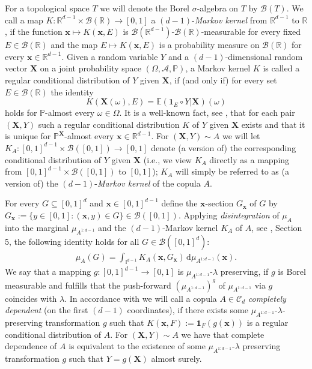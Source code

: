 \documentclass[12pt,a4paper]{amsart}
\theoremstyle{definition}
\newcommand{\kc}{\mathcal{C}}
\begin{document}
For a topological space $T$ we will denote the Borel $\sigma$-algebra on $T$ by $\mathcal{B}(T)$.
We call a map 
$K: \mathbb{R}^{d-1}\times\mathcal{B}(\mathbb{R}) \rightarrow [0,1]$ a
$(d-1)$-\emph{Markov kernel} from 
$\mathbb{R}^{d-1}$ to $\mathbb{R}$, if the function 
$\mathbf{x}\mapsto K(\mathbf{x},E)$ is 
$\mathcal{B}(\mathbb{R}^{d-1})$-$\mathcal{B}(\mathbb{R})$-measurable for every fixed 
$E\in\mathcal{B}(\mathbb{R})$ and the map $E\mapsto K(\mathbf{x},E)$ is a probability measure 
on $\mathcal{B}(\mathbb{R})$ for every $\mathbf{x}\in\mathbb{R}^{d-1}$. 
Given a random variable $Y$ and a $(d-1)$-dimensional random vector 
$\mathbf{X}$ on a joint probability space $(\Omega,\mathcal{A},\mathbb{P})$, a Markov kernel 
$K$ is called a regular conditional distribution of
$Y$ given $\mathbf{X}$, if (and only if) for every set 
$E \in \mathcal{B}(\mathbb{R})$ the identity 
$$
K(\mathbf{X}(\omega), E) = \mathbb{E}(\mathbf{1}_E \circ Y | \mathbf{X})(\omega)
$$
holds for $\mathbb{P}$-almost every $\omega \in \Omega$.
It is a well-known fact, see \cite{Kallenberg}, that for each pair $(\mathbf{X}, Y)$ 
such a regular conditional distribution $K$ of $Y$ given $\mathbf{X}$ exists and that it is 
unique for $\mathbb{P}^{\mathbf{X}}$-almost every $\mathbf{x} \in \mathbb{R}^{d-1}$.
For $(\mathbf{X}, Y) \sim A$ we will let 
$K_{A}:[0,1]^{d-1} \times \mathcal{B}([0,1]) \to [0,1]$ denote (a version of) the corresponding 
conditional distribution of $Y$ given $\mathbf{X}$ (i.e., we view 
$K_A$ directly as a mapping from $[0,1]^{d-1} \times \mathcal{B}([0,1])$ to 
$[0,1]$); $K_A$ will simply be referred to as 
(a version of) the $(d-1)$-\emph{Markov kernel} of the copula $A$. 

For every $G \subseteq [0,1]^d$ and $\mathbf{x} \in [0,1]^{d-1}$ 
define the $\mathbf{x}$-section $G_\mathbf{x}$ of $G$ by $G_{\mathbf{x}}:=\{y\in [0,1]: 
(\mathbf{x},y) \in G\}\in\mathcal{B}([0,1])$. 
Applying \emph{disintegration} of $\mu_A$ into the marginal $\mu_{A^{1:d-1}}$ and the 
$(d-1)$-Markov kernel $K_A$ of $A$,
 see \cite{Kallenberg}, Section 5, the following identity 
holds for all $G \in \mathcal{B}([0,1]^d)$:
\begin{align}\label{eq:DI}
	\mu_A(G) = \int_{\mathbb{I}^{d-1}} K_{A}(\mathbf{x},G_{\mathbf{x}})
	\, \mathrm{d}\mu_{A^{1:d-1}}(\mathbf{x}).
\end{align}
We say that a mapping $g: [0,1]^{d-1} \rightarrow [0,1]$ is $\mu_{A^{1:d-1}}$-$\lambda$ preserving, if $g$ is Borel measurable and fulfills 
that the push-forward $(\mu_{A^{1:d-1}})^g$ of $\mu_{A^{1:d-1}}$ via $g$ 
coincides with $\lambda$.
In accordance with \cite{GJT} we will call a copula $A \in \kc_d$ \emph{completely dependent} (on the first $(d-1)$ coordinates), if there exists some 
$\mu_{A^{1:d-1}}$-$\lambda$-preserving transformation $g$ such that
$K(\mathbf{x},F):=\mathbf{1}_F(g(\mathbf{x}))$ is a regular conditional distribution of $A$. 
For $(\mathbf{X},Y)\sim A$ we have that complete dependence of $A$ is equivalent to the
existence of some $\mu_{A^{1:d-1}}$-$\lambda$ preserving transformation $g$ such that
$Y=g(\mathbf{X})$ almost surely. 
\end{document}
